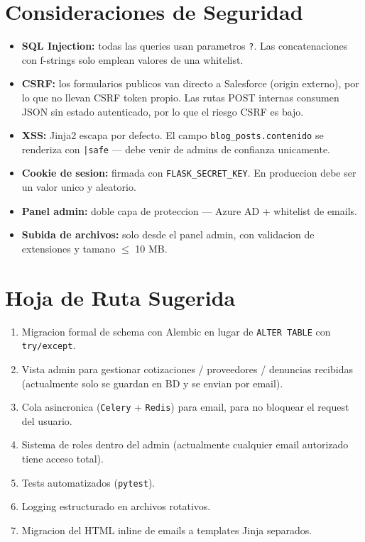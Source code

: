 \documentclass[11pt,a4paper]{article}
\begin{document}
\section{Consideraciones de Seguridad}

\begin{itemize}[leftmargin=*]
    \item \textbf{SQL Injection:} todas las queries usan parametros
        \texttt{?}. Las concatenaciones con f-strings solo emplean valores
        de una whitelist.
    \item \textbf{CSRF:} los formularios publicos van directo a Salesforce
        (origin externo), por lo que no llevan CSRF token propio. Las rutas
        POST internas consumen JSON sin estado autenticado, por lo que el
        riesgo CSRF es bajo.
    \item \textbf{XSS:} Jinja2 escapa por defecto. El campo
        \texttt{blog\_posts.contenido} se renderiza con \texttt{|safe} ---
        debe venir de admins de confianza unicamente.
    \item \textbf{Cookie de sesion:} firmada con \texttt{FLASK\_SECRET\_KEY}.
        En produccion debe ser un valor unico y aleatorio.
    \item \textbf{Panel admin:} doble capa de proteccion --- Azure AD +
        whitelist de emails.
    \item \textbf{Subida de archivos:} solo desde el panel admin, con
        validacion de extensiones y tamano $\leq$ 10 MB.
\end{itemize}

\section{Hoja de Ruta Sugerida}

\begin{enumerate}[leftmargin=*]
    \item Migracion formal de schema con Alembic en lugar de
        \texttt{ALTER TABLE} con \texttt{try/except}.
    \item Vista admin para gestionar cotizaciones / proveedores / denuncias
        recibidas (actualmente solo se guardan en BD y se envian por email).
    \item Cola asincronica (\texttt{Celery} + \texttt{Redis}) para email,
        para no bloquear el request del usuario.
    \item Sistema de roles dentro del admin (actualmente cualquier email
        autorizado tiene acceso total).
    \item Tests automatizados (\texttt{pytest}).
    \item Logging estructurado en archivos rotativos.
    \item Migracion del HTML inline de emails a templates Jinja separados.
\end{enumerate}
\end{document}
